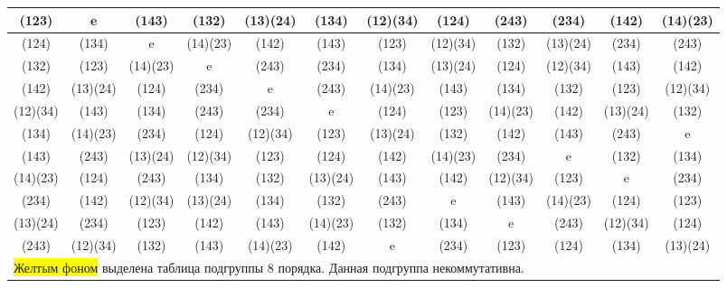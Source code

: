 \begin{table}[h!]
\begin{tabular}{cccccccccccc}
(123) & e & (143) & (132) & (13)(24) & (134) & (12)(34) & (124) & (243) & (234) & (142) & (14)(23) \\ \hline
(124) & (134) & e & (14)(23) & (142) & (143) & (123) & (12)(34) & (132) & (13)(24) & (234) & (243) \\ \hline
(132) & (123) & (14)(23) & e & (243) & (234) & (134) & (13)(24) & (124) & (12)(34) & (143) & (142) \\ \hline
(142) & (13)(24) & (124) & (234) & e & (243) & (14)(23) & (143) & (134) & (132) & (123) & (12)(34) \\ \hline
\cellcolor{yellow}(12)(34) & (143) & (134) & (243) & (234) &\cellcolor{yellow} e & (124) & (123) &\cellcolor{yellow} (14)(23) & (142) &\cellcolor{yellow} (13)(24) & (132) \\ \hline
(134) & (14)(23) & (234) & (124) & (12)(34) & (123) & (13)(24) & (132) & (142) & (143) & (243) & e \\ \hline
(143) & (243) & (13)(24) & (12)(34) & (123) & (124) & (142) & (14)(23) & (234) & e & (132) & (134) \\ \hline
\cellcolor{yellow}(14)(23) & (124) & (243) & (134) & (132) &\cellcolor{yellow} (13)(24) & (143) & (142) &\cellcolor{yellow} (12)(34) & (123) &\cellcolor{yellow} e & (234) \\ \hline
(234) & (142) & (12)(34) & (13)(24) & (134) & (132) & (243) & e & (143) & (14)(23) & (124) & (123) \\ \hline
\cellcolor{yellow}(13)(24) & (234) & (123) & (142) & (143) & \cellcolor{yellow}(14)(23) & (132) & (134) &\cellcolor{yellow} e & (243) & \cellcolor{yellow}(12)(34) & (124) \\ \hline
(243) & (12)(34) & (132) & (143) & (14)(23) & (142) & e & (234) & (123) & (124) & (134) & (13)(24) \\ \hline
\multicolumn{12}{l}{\colorbox{yellow}{Желтым фоном} выделена таблица подгруппы 8 порядка. Данная подгруппа некоммутативна.}
\end{tabular}
\end{table}

